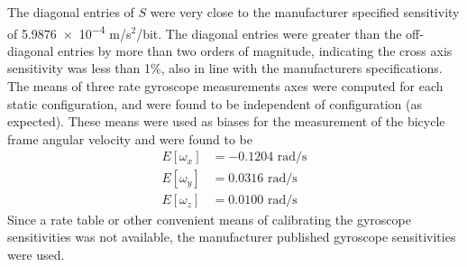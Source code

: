 The diagonal entries of $S$ were very close to the manufacturer specified
sensitivity of \num{5.9876e-4} m/s$^2$/bit. The diagonal entries were greater than
the off-diagonal entries by more than two orders of magnitude, indicating the
cross axis sensitivity was less than 1\%, also in line with the manufacturers
specifications. The means of three rate gyroscope measurements axes were
computed for each static configuration, and were found to be independent of
configuration (as expected). These means were used as biases for the
measurement of the bicycle frame angular velocity and were found to be
\begin{align}
  E[\omega_x] &= -0.1204\text{ rad/s}\\
  E[\omega_y] &=  0.0316 \text{ rad/s}\\
  E[\omega_z] &=  0.0100 \text{ rad/s}
\end{align}
Since a rate table or other convenient means of calibrating the gyroscope
sensitivities was not available, the manufacturer published gyroscope
sensitivities were used.











